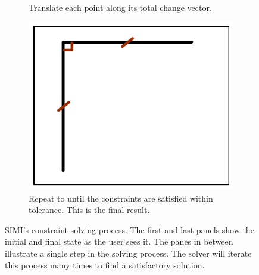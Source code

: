 \begin{figure}
\begin{subfigure}[t]{51mm}
    \caption{Translate each point along its total change vector.}
    \label{fig:solving-total-change}
  \end{subfigure}
  \hspace{1mm} %
  \begin{subfigure}[t]{51mm}
    \includegraphics[width=\linewidth]{img/solving-final.pdf}
    \caption{Repeat \textit{} to
      \textit{} until the constraints
      are satisfied within tolerance. This is the final result.}
    \label{fig:solving-final}
  \end{subfigure}
  \caption[Constraint solver]{SIMI's constraint solving process. The
    first and last panels show the initial and final state as the user
    sees it. The panes in between illustrate a single step in the
    solving process. The solver will iterate this process many times
    to find a satisfactory solution.}
  \label{fig:solving}
\end{figure}
